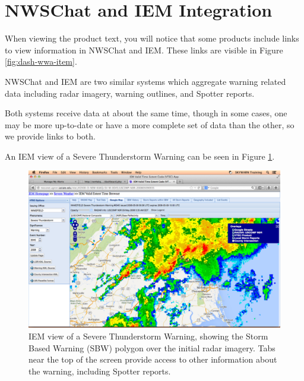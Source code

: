 \documentclass[pdflatex,letterpaper,twoside,12pt]{book}
\begin{document}

\section{NWSChat and IEM Integration}\label{iem-integration}

When viewing the product text, you will notice that some products include links to view information in NWSChat and IEM.  These links are visible in Figure \ref{fig:dash-wwa-item}.

NWSChat and IEM are two similar systems which aggregate warning related data including radar imagery, warning outlines, and Spotter reports.

Both systems receive data at about the same time, though in some cases, one may be more up-to-date or have a more complete set of data than the other, so we provide links to both.


An IEM view of a Severe Thunderstorm Warning can be seen in Figure \ref{fig:dash-emwin-iembot}.

\begin{figure}[t]
  \centering
  \includegraphics[width=\textwidth,keepaspectratio=true]{img/dash-emwin-iembot-1}
  \caption{IEM view of a Severe Thunderstorm Warning, showing the Storm Based Warning (SBW) polygon over the initial radar imagery.  Tabs near the top of the screen provide access to other information about the warning, including Spotter reports.\label{fig:dash-emwin-iembot}}
\end{figure}
\end{document}

